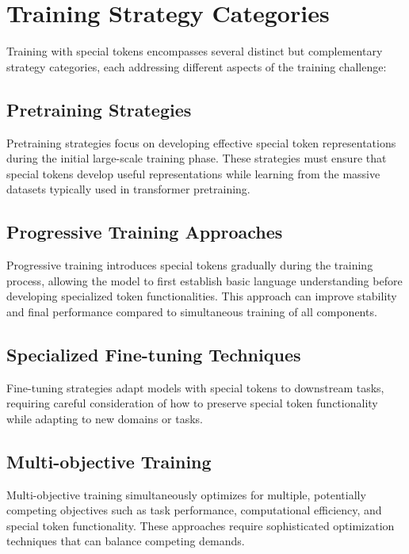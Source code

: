 \section{Training Strategy Categories}

Training with special tokens encompasses several distinct but complementary strategy categories, each addressing different aspects of the training challenge:

\subsection{Pretraining Strategies}

Pretraining strategies focus on developing effective special token representations during the initial large-scale training phase. These strategies must ensure that special tokens develop useful representations while learning from the massive datasets typically used in transformer pretraining.

\subsection{Progressive Training Approaches}

Progressive training introduces special tokens gradually during the training process, allowing the model to first establish basic language understanding before developing specialized token functionalities. This approach can improve stability and final performance compared to simultaneous training of all components.

\subsection{Specialized Fine-tuning Techniques}

Fine-tuning strategies adapt models with special tokens to downstream tasks, requiring careful consideration of how to preserve special token functionality while adapting to new domains or tasks.

\subsection{Multi-objective Training}

Multi-objective training simultaneously optimizes for multiple, potentially competing objectives such as task performance, computational efficiency, and special token functionality. These approaches require sophisticated optimization techniques that can balance competing demands.

